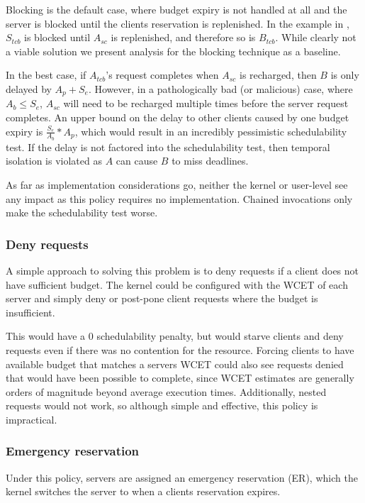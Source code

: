 Blocking is the default case, where budget expiry is not handled at all and the server is blocked until the clients reservation is replenished.
In the example in , $S_{tcb}$ is blocked until $A_{sc}$ is replenished, and therefore so is $B_{tcb}$.
While clearly not a viable solution we present analysis for the blocking technique as a baseline.

In the best case, if $A_{tcb}$'s request completes when $A_{sc}$ is recharged, then $B$ is only delayed by $A_{p} + S_{e}$.
However, in a pathologically bad (or malicious) case, where $A_{b} \leq S_{e}$, $A_{sc}$ will need to be recharged multiple times before the server request completes.
An upper bound on the delay to other clients caused by one budget expiry is $\frac{S_{e}}{A_{b}} * A_{p}$, which would result in an incredibly pessimistic schedulability test.
If the delay is not factored into the schedulability test, then temporal isolation is violated as $A$ can cause $B$ to miss deadlines.

As far as implementation considerations go, neither the kernel or user-level see any impact as this policy requires no implementation.
Chained invocations only make the schedulability test worse.

\subsubsection{Deny requests}

A simple approach to solving this problem is to deny requests if a client does not have sufficient budget.
The kernel could be configured with the \gls{WCET} of each server and simply deny or post-pone client requests where the budget is insufficient.

This would have a 0 schedulability penalty, but would starve clients and deny requests even if there was no contention for the resource.
Forcing clients to have available budget that matches a servers \gls{WCET} could also see requests denied that would have been possible to complete, since \gls{WCET} estimates are generally orders of magnitude beyond average execution times.
Additionally, nested requests would not work, so although simple and effective, this policy is impractical.

\subsubsection{Emergency reservation}

Under this policy, servers are assigned an emergency reservation (ER), which the kernel switches the server to when a clients reservation expires.

